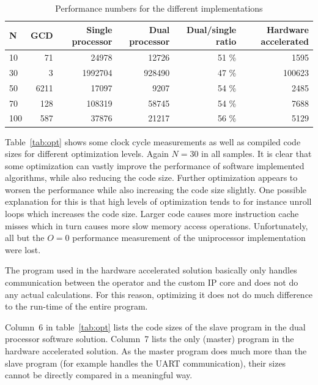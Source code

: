 \documentclass[11pt]{article}
\begin{document}
\begin{table}[htbp]
   \centering
   \begin{tabular}{l|rrrrr}
      \toprule
	N & GCD & Single processor	& Dual processor & Dual/single ratio & Hardware accelerated\\
      \midrule
      10	& 71 & 24978			& 12726	& 51 \%		&1595\\
      30	& 3 & 1992704		&  928490	& 47 \%	&100623\\
      50	& 6211 & 17097			& 9207	& 54 \%		&2485\\
      70	& 128 & 108319		& 58745	& 54 \%		&7688\\
     100	& 587 & 37876			&  21217 & 56 \%		&5129\\
      \bottomrule
   \end{tabular}
   \caption{Performance numbers for the different implementations}
   \label{tab:Clockcycles}
\end{table}

Table~\ref{tab:opt} shows some clock cycle measurements as well as compiled code sizes for different optimization levels. Again $N=30$ in all samples. It is clear that some optimization can vastly improve the performance of software implemented algorithms, while also reducing the code size. Further optimization appears to worsen the performance while also increasing the code size slightly. One possible explanation for this is that high levels of optimization tends to for instance unroll loops which increases the code size. Larger code causes more instruction cache misses which in turn causes more slow memory access operations. Unfortunately, all but the $O=0$ performance measurement of the uniprocessor implementation were lost.

The program used in the hardware accelerated solution basically only handles communication between the operator and the custom IP core and does not do any actual calculations. For this reason, optimizing it does not do much difference to the run-time of the entire program.

Column~6 in table~\ref{tab:opt} lists the code sizes of the slave program in the dual processor software solution. Column~7 lists the only (master) program in the hardware accelerated solution. As the master program does much more than the slave program (for example handles the UART communication), their sizes cannot be directly compared in a meaningful way.
\end{document}
